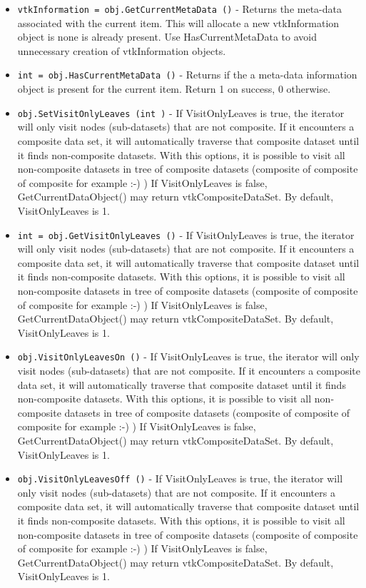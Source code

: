\begin{itemize}
\item  \verb|vtkInformation = obj.GetCurrentMetaData ()| -  Returns the meta-data associated with the current item. This will allocate
 a new vtkInformation object is none is already present. Use
 HasCurrentMetaData to avoid unnecessary creation of vtkInformation objects.

\item  \verb|int = obj.HasCurrentMetaData ()| -  Returns if the a meta-data information object is present for the current
 item. Return 1 on success, 0 otherwise.

\item  \verb|obj.SetVisitOnlyLeaves (int )| -  If VisitOnlyLeaves is true, the iterator will only visit nodes
 (sub-datasets) that are not composite. If it encounters a composite
 data set, it will automatically traverse that composite dataset until
 it finds non-composite datasets. With this options, it is possible to
 visit all non-composite datasets in tree of composite datasets
 (composite of composite of composite for example :-) ) If
 VisitOnlyLeaves is false, GetCurrentDataObject() may return
 vtkCompositeDataSet. By default, VisitOnlyLeaves is 1.

\item  \verb|int = obj.GetVisitOnlyLeaves ()| -  If VisitOnlyLeaves is true, the iterator will only visit nodes
 (sub-datasets) that are not composite. If it encounters a composite
 data set, it will automatically traverse that composite dataset until
 it finds non-composite datasets. With this options, it is possible to
 visit all non-composite datasets in tree of composite datasets
 (composite of composite of composite for example :-) ) If
 VisitOnlyLeaves is false, GetCurrentDataObject() may return
 vtkCompositeDataSet. By default, VisitOnlyLeaves is 1.

\item  \verb|obj.VisitOnlyLeavesOn ()| -  If VisitOnlyLeaves is true, the iterator will only visit nodes
 (sub-datasets) that are not composite. If it encounters a composite
 data set, it will automatically traverse that composite dataset until
 it finds non-composite datasets. With this options, it is possible to
 visit all non-composite datasets in tree of composite datasets
 (composite of composite of composite for example :-) ) If
 VisitOnlyLeaves is false, GetCurrentDataObject() may return
 vtkCompositeDataSet. By default, VisitOnlyLeaves is 1.

\item  \verb|obj.VisitOnlyLeavesOff ()| -  If VisitOnlyLeaves is true, the iterator will only visit nodes
 (sub-datasets) that are not composite. If it encounters a composite
 data set, it will automatically traverse that composite dataset until
 it finds non-composite datasets. With this options, it is possible to
 visit all non-composite datasets in tree of composite datasets
 (composite of composite of composite for example :-) ) If
 VisitOnlyLeaves is false, GetCurrentDataObject() may return
 vtkCompositeDataSet. By default, VisitOnlyLeaves is 1.


\end{itemize}
